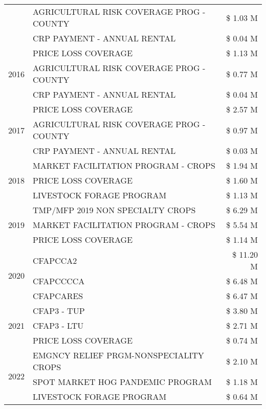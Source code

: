 \begin{tabular}{llr}
 & AGRICULTURAL RISK COVERAGE PROG - COUNTY & \$ 1.03 M \\
 & CRP PAYMENT - ANNUAL RENTAL & \$ 0.04 M \\
\cline{1-3}
\multirow[t]{3}{*}{2016} & PRICE LOSS COVERAGE & \$ 1.13 M \\
 & AGRICULTURAL RISK COVERAGE PROG - COUNTY & \$ 0.77 M \\
 & CRP PAYMENT - ANNUAL RENTAL & \$ 0.04 M \\
\cline{1-3}
\multirow[t]{3}{*}{2017} & PRICE LOSS COVERAGE & \$ 2.57 M \\
 & AGRICULTURAL RISK COVERAGE PROG - COUNTY & \$ 0.97 M \\
 & CRP PAYMENT - ANNUAL RENTAL & \$ 0.03 M \\
\cline{1-3}
\multirow[t]{3}{*}{2018} & MARKET FACILITATION PROGRAM - CROPS & \$ 1.94 M \\
 & PRICE LOSS COVERAGE & \$ 1.60 M \\
 & LIVESTOCK FORAGE PROGRAM & \$ 1.13 M \\
\cline{1-3}
\multirow[t]{3}{*}{2019} & TMP/MFP 2019 NON SPECIALTY CROPS & \$ 6.29 M \\
 & MARKET FACILITATION PROGRAM - CROPS & \$ 5.54 M \\
 & PRICE LOSS COVERAGE & \$ 1.14 M \\
\cline{1-3}
\multirow[t]{3}{*}{2020} & CFAPCCA2 & \$ 11.20 M \\
 & CFAPCCCCA & \$ 6.48 M \\
 & CFAPCARES & \$ 6.47 M \\
\cline{1-3}
\multirow[t]{3}{*}{2021} & CFAP3 - TUP & \$ 3.80 M \\
 & CFAP3 - LTU & \$ 2.71 M \\
 & PRICE LOSS COVERAGE & \$ 0.74 M \\
\cline{1-3}
\multirow[t]{3}{*}{2022} & EMGNCY RELIEF PRGM-NONSPECIALITY CROPS & \$ 2.10 M \\
 & SPOT MARKET HOG PANDEMIC PROGRAM & \$ 1.18 M \\
 & LIVESTOCK FORAGE PROGRAM & \$ 0.64 M \\
\cline{1-3}
\bottomrule
\end{tabular}
